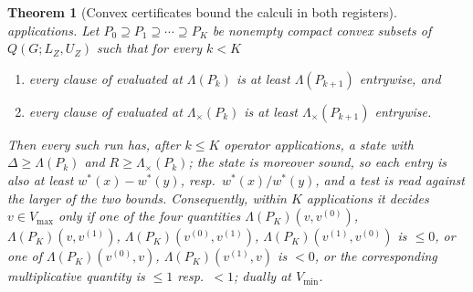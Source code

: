 \documentclass[11pt]{article}
\theoremstyle{plain}
\newtheorem{theorem}{Theorem}[section]
\theoremstyle{definition}
\newcommand{\Vmax}{V_{\max}}
\newcommand{\Vmin}{V_{\min}}
\begin{document}
\begin{theorem}[Convex certificates bound the calculi in both registers]
applications. Let $P_0\supseteq P_1\supseteq\cdots\supseteq P_K$ be nonempty compact
convex subsets of $Q(G;L_Z,U_Z)$ such that for every $k<K$
\begin{enumerate}[label=\textup{(\roman*)},leftmargin=2.6em]
\item every clause of  evaluated at $\Lambda(P_k)$ is at
  least $\Lambda(P_{k+1})$ entrywise, and
\item every clause of  evaluated at
  $\Lambda_{\times}(P_k)$ is at least $\Lambda_{\times}(P_{k+1})$
  entrywise.
\end{enumerate}
Then every such run has, after $k\le K$ operator applications, a state
with $\Delta\ge\Lambda(P_k)$ and $R\ge\Lambda_{\times}(P_k)$; the state is
moreover sound, so each entry is also at least $w^\ast(x)-w^\ast(y)$,
resp.\ $w^\ast(x)/w^\ast(y)$, and a test is read against the larger of
the two bounds. Consequently, within $K$ applications it decides
$v\in\Vmax$ only if one of the four quantities
$\Lambda(P_K)(v,v^{(0)})$, $\Lambda(P_K)(v,v^{(1)})$,
$\Lambda(P_K)(v^{(0)},v^{(1)})$, $\Lambda(P_K)(v^{(1)},v^{(0)})$ is
$\le 0$, or one of $\Lambda(P_K)(v^{(0)},v)$, $\Lambda(P_K)(v^{(1)},v)$
is $<0$, or the corresponding multiplicative quantity is $\le1$
resp.\ $<1$; dually at $\Vmin$.
\end{theorem}
\end{document}
